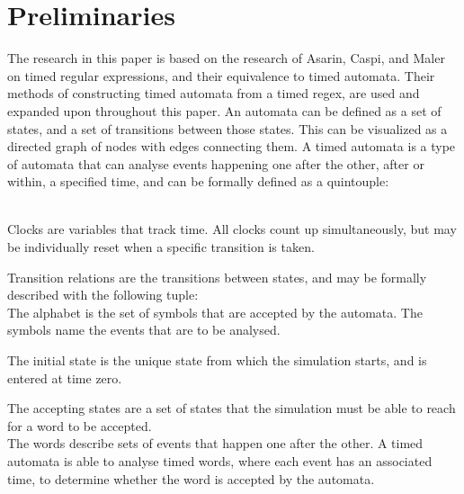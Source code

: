 \section{Preliminaries}






The research in this paper is based on the research of Asarin, Caspi, and Maler \cite{Eugene2001} on timed regular expressions, and their equivalence to timed automata. Their methods of constructing timed automata from a timed regex, are used and expanded upon throughout this paper.
An automata can be defined as a set of states, and a set of transitions between those states. This can be visualized as a directed graph of nodes with edges connecting them.
A timed automata\cite{ALUR1994183} is a type of automata that can analyse events happening one after the other, after or within, a specified time, and can be formally defined as a quintouple:

\\

Clocks are variables that track time. All clocks count up simultaneously, but may be individually reset when a specific transition is taken.

Transition relations are the transitions between states, and may be formally described with the following tuple:
\\

The alphabet is the set of symbols that are accepted by the automata. The symbols name the events that are to be analysed.

The initial state is the unique state from which the simulation starts, and is entered at time zero.

The accepting states are a set of states that the simulation must be able to reach for a word to be accepted.\\

The words describe sets of events that happen one after the other. A timed automata is able to analyse timed words, where each event has an associated time, to determine whether the word is accepted by the automata.


